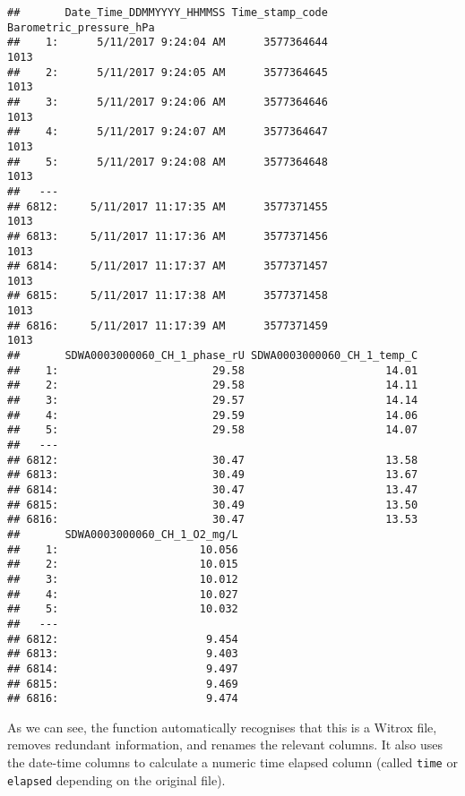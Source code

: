 \documentclass[]{book}
\begin{document}
\begin{verbatim}
##       Date_Time_DDMMYYYY_HHMMSS Time_stamp_code Barometric_pressure_hPa
##    1:      5/11/2017 9:24:04 AM      3577364644                    1013
##    2:      5/11/2017 9:24:05 AM      3577364645                    1013
##    3:      5/11/2017 9:24:06 AM      3577364646                    1013
##    4:      5/11/2017 9:24:07 AM      3577364647                    1013
##    5:      5/11/2017 9:24:08 AM      3577364648                    1013
##   ---                                                                  
## 6812:     5/11/2017 11:17:35 AM      3577371455                    1013
## 6813:     5/11/2017 11:17:36 AM      3577371456                    1013
## 6814:     5/11/2017 11:17:37 AM      3577371457                    1013
## 6815:     5/11/2017 11:17:38 AM      3577371458                    1013
## 6816:     5/11/2017 11:17:39 AM      3577371459                    1013
##       SDWA0003000060_CH_1_phase_rU SDWA0003000060_CH_1_temp_C
##    1:                        29.58                      14.01
##    2:                        29.58                      14.11
##    3:                        29.57                      14.14
##    4:                        29.59                      14.06
##    5:                        29.58                      14.07
##   ---                                                        
## 6812:                        30.47                      13.58
## 6813:                        30.49                      13.67
## 6814:                        30.47                      13.47
## 6815:                        30.49                      13.50
## 6816:                        30.47                      13.53
##       SDWA0003000060_CH_1_O2_mg/L
##    1:                      10.056
##    2:                      10.015
##    3:                      10.012
##    4:                      10.027
##    5:                      10.032
##   ---                            
## 6812:                       9.454
## 6813:                       9.403
## 6814:                       9.497
## 6815:                       9.469
## 6816:                       9.474
\end{verbatim}

As we can see, the function automatically recognises that this is a
Witrox file, removes redundant information, and renames the relevant
columns. It also uses the date-time columns to calculate a numeric time
elapsed column (called \texttt{time} or \texttt{elapsed} depending on
the original file).
\end{document}
